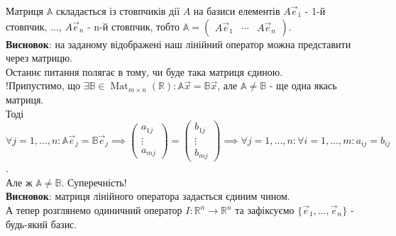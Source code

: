 \documentclass[a4paper, 10pt]{article}
\theoremstyle{theoremdd}
\newtheorem{definition}[theorem]{Definition}
\DeclareMathOperator{\Mat}{Mat}
\begin{document}
	Матриця $\mathbb{A}$ складається із стовпчиків дії $A$ на базиси елементів $A\vec{e}_1$ - 1-й стовпчик, ..., $A\vec{e}_n$ - n-й стовпчик, тобто $\mathbb{A} = \begin{pmatrix} A\vec{e}_1 & \cdots & A\vec{e}_n \end{pmatrix}$.\\
	\textbf{Висновок}: на заданому відображені наш лінійний оператор можна представити через матрицю.
	\bigskip \\
	Останнє питання полягає в тому, чи буде така матриця єдиною.\\
	!Припустимо, що $\exists \mathbb{B} \in \Mat_{m \times n}(\mathbb{R}): \mathbb{A} \vec{x} = \mathbb{B} \vec{x}$, але $\mathbb{A} \neq \mathbb{B}$ - ще одна якась матриця.\\
	Тоді $\forall j =1,\dots,n: \mathbb{A} \vec{e}_j = \mathbb{B} \vec{e}_j \implies \begin{pmatrix} a_{1j} \\ \vdots \\ a_{mj} \end{pmatrix} = \begin{pmatrix} b_{1j} \\ \vdots \\ b_{mj} \end{pmatrix} \implies \forall j=1,\dots,n: \forall i = 1,\dots,m: a_{ij} = b_{ij}$.\\
	Але ж $\mathbb{A} \neq \mathbb{B}$. Суперечність! \\
	\textbf{Висновок}: матриця лінійного оператора задається єдиним чином.
	\bigskip \\
	\iffalse
	\begin{definition}
	\textbf{Матрицею лінійного оператора} називають матрицю, що містить розклад кожного елементу $A \vec{e}_1, \dots, A \vec{e}_n$.
	\begin{align*}
	\mathbb{A} = \begin{pmatrix}
	A\vec{e}_1 & \dots & A\vec{e}_n
\end{pmatrix} = \begin{pmatrix}
	a_{11} & \dots & a_{1n} \\
	\vdots & \ddots & \vdots \\
	a_{m1} & \dots & a_{mn} \\
	\end{pmatrix}
	\end{align*}
	\end{definition}
	\noindent
	\fi
	А тепер розглянемо одиничний оператор $I \colon \mathbb{R}^n \to \mathbb{R}^n$ та зафіксуємо $\{\vec{e}_1, \dots, \vec{e}_n\}$ - будь-який базис.\\
\end{document}
